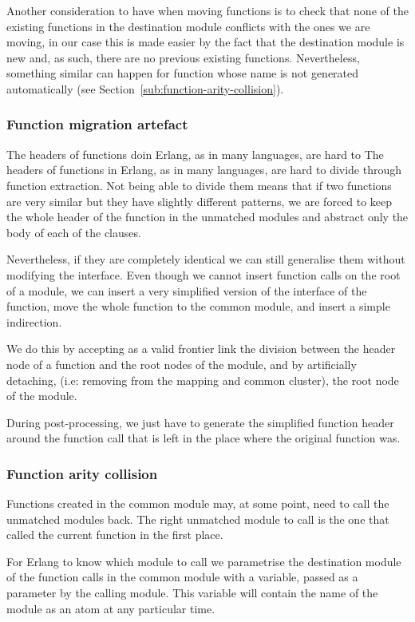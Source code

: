 Another consideration to have when moving functions is to check that
none of the existing functions in the destination module conflicts
with the ones we are moving, in our case this is made easier by the
fact that the destination module is new and, as such, there are no
previous existing functions. Nevertheless, something similar can happen
for function whose name is not generated automatically (see Section~\ref{sub:function-arity-collision}).


\subsubsection{Function migration artefact\label{sub:function-migration-artefact}}
The headers of functions doin Erlang, as in many languages, are hard to
The headers of functions in Erlang, as in many languages, are hard to
divide through function extraction. Not being able to divide them
means that if two functions are very similar but they have slightly
different patterns, we are forced to keep the whole header of the
function in the unmatched modules and abstract only the body of each
of the clauses.

Nevertheless, if they are completely identical we can still generalise
them without modifying the interface. Even though we cannot insert
function calls on the root of a module, we can insert a very simplified
version of the interface of the function, move the whole function to the
common module, and insert a simple indirection.

We do this by accepting as a valid frontier link the division between the
header node of a function and the root nodes of the module, and by artificially
detaching, (i.e: removing from the mapping and common cluster), the
root node of the module.

During post-processing, we just have to generate the simplified function
header around the function call that is left in the place where the
original function was.


\subsubsection{Function arity collision\label{sub:function-arity-collision}}

Functions created in the common module may, at some point, need to
call the unmatched modules back. The right unmatched module to call
is the one that called the current function in the first place.

For Erlang to know which module to call we parametrise the destination
module of the function calls in the common module with a variable,
passed as a parameter by the calling module. This variable will contain
the name of the module as an atom at any particular time.

